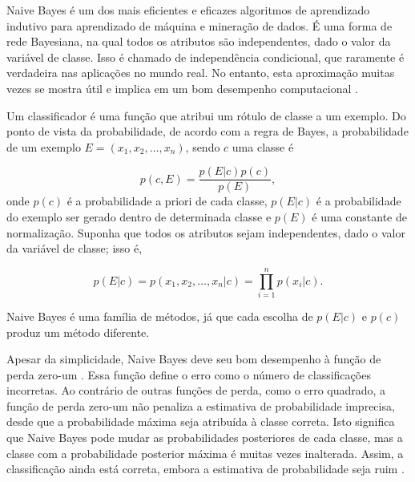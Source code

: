 Naive Bayes é um dos mais eficientes e eficazes algoritmos de aprendizado indutivo para aprendizado de máquina e mineração de dados. É uma forma de rede Bayesiana, na qual todos os atributos são independentes, dado o valor da variável de classe. Isso é chamado de independência condicional, que raramente é verdadeira nas aplicações no mundo real. No entanto, esta aproximação muitas vezes se mostra útil e implica em um bom desempenho computacional \cite{zhang2004}.






Um classificador é uma função que atribui um rótulo de classe a um exemplo. Do ponto de vista da probabilidade, de acordo com a regra de Bayes, a probabilidade de um exemplo $E = (x_1, x_2, \dots, x_n)$, sendo $c$ uma classe é


\begin{equation}
p(c,E) = \frac{p(E|c)p(c)}{p(E)},
\end{equation} 
%
onde $p(c)$ é a probabilidade a priori de cada classe, $p(E|c)$ é a probabilidade do exemplo ser gerado dentro de determinada classe e $p(E)$ é uma constante de normalização.
Suponha que todos os atributos sejam independentes, dado o valor da variável de classe; isso é,

\begin{equation}
p(E|c) = p(x_1, x_2, \dots, x_n|c) = \prod_{i=1}^{n} p(x_i|c).
\end{equation}

\noindent
Naive Bayes é uma família de métodos, já que cada escolha de $p(E|c)$ e $p(c)$ produz um método diferente.

Apesar da simplicidade, Naive Bayes deve seu bom desempenho à função de perda zero-um . Essa função define o erro como o número de classificações incorretas. Ao contrário de outras funções de perda, como o erro quadrado, a função de perda zero-um não penaliza a estimativa de probabilidade imprecisa, desde que a probabilidade máxima seja atribuída à classe correta. Isto significa que Naive Bayes pode mudar as probabilidades posteriores de cada classe, mas a classe com a probabilidade posterior máxima é muitas vezes inalterada. Assim, a classificação ainda está correta, embora a estimativa de probabilidade seja ruim .


